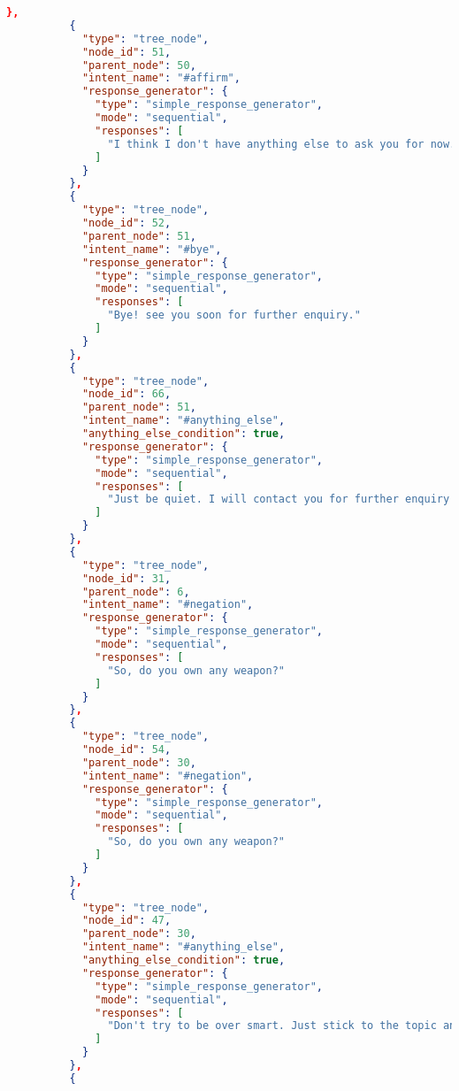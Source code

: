 \begin{appendix}
\begin{lstlisting}[language=json, firstnumber=1]
          },
          {
            "type": "tree_node",
            "node_id": 51,
            "parent_node": 50,
            "intent_name": "#affirm",
            "response_generator": {
              "type": "simple_response_generator",
              "mode": "sequential",
              "responses": [
                "I think I don't have anything else to ask you for now. Once I will have the report, I will enquire you again. Bye!"
              ]
            }
          },
          {
            "type": "tree_node",
            "node_id": 52,
            "parent_node": 51,
            "intent_name": "#bye",
            "response_generator": {
              "type": "simple_response_generator",
              "mode": "sequential",
              "responses": [
                "Bye! see you soon for further enquiry."
              ]
            }
          },
          {
            "type": "tree_node",
            "node_id": 66,
            "parent_node": 51,
            "intent_name": "#anything_else",
            "anything_else_condition": true,
            "response_generator": {
              "type": "simple_response_generator",
              "mode": "sequential",
              "responses": [
                "Just be quiet. I will contact you for further enquiry later."
              ]
            }
          },
          {
            "type": "tree_node",
            "node_id": 31,
            "parent_node": 6,
            "intent_name": "#negation",
            "response_generator": {
              "type": "simple_response_generator",
              "mode": "sequential",
              "responses": [
                "So, do you own any weapon?"
              ]
            }
          },
          {
            "type": "tree_node",
            "node_id": 54,
            "parent_node": 30,
            "intent_name": "#negation",
            "response_generator": {
              "type": "simple_response_generator",
              "mode": "sequential",
              "responses": [
                "So, do you own any weapon?"
              ]
            }
          },
          {
            "type": "tree_node",
            "node_id": 47,
            "parent_node": 30,
            "intent_name": "#anything_else",
            "anything_else_condition": true,
            "response_generator": {
              "type": "simple_response_generator",
              "mode": "sequential",
              "responses": [
                "Don't try to be over smart. Just stick to the topic and answer my last question."
              ]
            }
          },
          {

\end{lstlisting}
\end{appendix}

